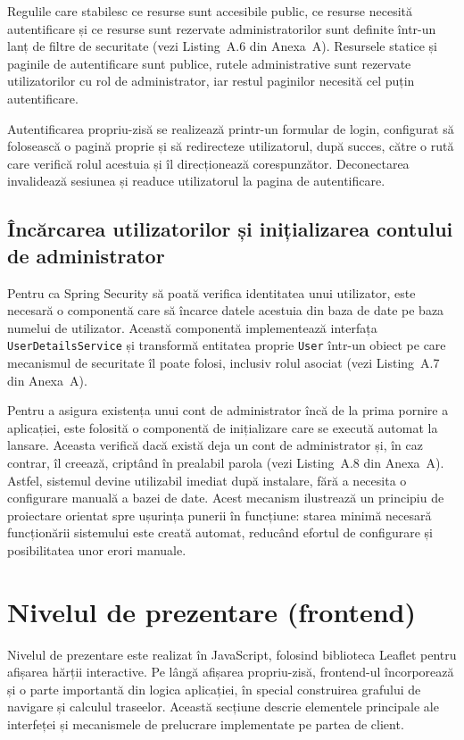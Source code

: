 Regulile care stabilesc ce resurse sunt accesibile public, ce resurse necesită
autentificare și ce resurse sunt rezervate administratorilor sunt definite
într-un lanț de filtre de securitate (vezi Listing~A.6 din Anexa~A).
Resursele statice și paginile de autentificare sunt publice, rutele
administrative sunt rezervate utilizatorilor cu rol de administrator, iar
restul paginilor necesită cel puțin autentificare.

Autentificarea propriu-zisă se realizează printr-un formular de login,
configurat să folosească o pagină proprie și să redirecteze utilizatorul,
după succes, către o rută care verifică rolul acestuia și îl direcționează
corespunzător. Deconectarea invalidează sesiunea și readuce utilizatorul la
pagina de autentificare.

\subsection{Încărcarea utilizatorilor și inițializarea contului de administrator}
\label{subsec:init-admin}

Pentru ca Spring Security să poată verifica identitatea unui utilizator, este
necesară o componentă care să încarce datele acestuia din baza de date pe
baza numelui de utilizator. Această componentă implementează interfața
\texttt{UserDetailsService} și transformă entitatea proprie \texttt{User}
într-un obiect pe care mecanismul de securitate îl poate folosi, inclusiv
rolul asociat (vezi Listing~A.7 din Anexa~A).

Pentru a asigura existența unui cont de administrator încă de la prima
pornire a aplicației, este folosită o componentă de inițializare care se
execută automat la lansare. Aceasta verifică dacă există deja un cont de
administrator și, în caz contrar, îl creează, criptând în prealabil parola
(vezi Listing~A.8 din Anexa~A). Astfel, sistemul devine utilizabil imediat
după instalare, fără a necesita o configurare manuală a bazei de date. Acest
mecanism ilustrează un principiu de proiectare orientat spre ușurința punerii
în funcțiune: starea minimă necesară funcționării sistemului este creată
automat, reducând efortul de configurare și posibilitatea unor erori manuale.

\section{Nivelul de prezentare (frontend)}
\label{sec:frontend}

Nivelul de prezentare este realizat în JavaScript, folosind biblioteca Leaflet
\cite{Leaflet} pentru afișarea hărții interactive. Pe lângă afișarea
propriu-zisă, frontend-ul încorporează și o parte importantă din logica
aplicației, în special construirea grafului de navigare și calculul
traseelor. Această secțiune descrie elementele principale ale interfeței și
mecanismele de prelucrare implementate pe partea de client.
\newpage
